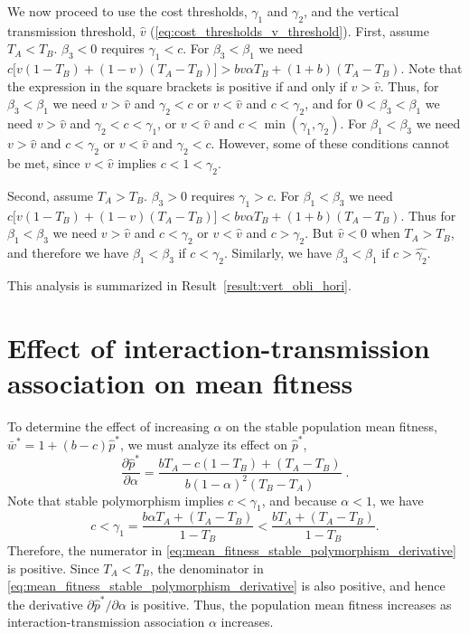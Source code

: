 \documentclass[12pt]{extarticle}
\begin{document}
\begin{appendices}
We now proceed to use the cost thresholds, $\gamma_1$ and $\gamma_2$, and the vertical transmission threshold, $\hat v$ (\autoref{eq:cost_thresholds_v_threshold}).
First, assume $T_A<T_B$.
$\beta_3<0$ requires $\gamma_1<c$.
For $\beta_3<\beta_1$ we need $c\big[v(1-T_B) + (1-v)(T_A-T_B)\big] > bv\alpha T_B + (1+b)(T_A-T_B)$.
Note that the expression in the square brackets is positive if and only if $v > \hat v$.
Thus, for $\beta_3<\beta_1$ we need $v > \hat v$ and $\gamma_2 < c$ or $v < \hat v$ and $c < \gamma_2$,
and for $0<\beta_3<\beta_1$ we need $v > \hat v$ and $\gamma_2 < c < \gamma_1$, or $v < \hat v$ and $c < \min(\gamma_1, \gamma_2)$. For $\beta_1<\beta_3$ we need $v > \hat v$ and $c<\gamma_2$ or $v < \hat v$ and $\gamma_2<c$.
However, some of these conditions cannot be met, since $v < \hat v$ implies $c<1<\gamma_2$.

Second, assume $T_A>T_B$.
$\beta_3>0$ requires $\gamma_1 > c$. 
For $\beta_1<\beta_3$ we need $c\big[v(1-T_B) + (1-v)(T_A-T_B)\big] < bv\alpha T_B + (1+b)(T_A-T_B)$.
Thus for $\beta_1<\beta_3$ we need $v > \hat v$ and $c < \gamma_2 $ or $v < \hat v$ and $c > \gamma_2$.
But $\hat{v}<0$ when $T_A > T_B$, and therefore we have $\beta_1<\beta_3$ if $c < \gamma_2$. Similarly, we have $\beta_3<\beta_1$ if $c > \hat{\gamma_2}$.

This analysis is summarized in Result~\ref{result:vert_obli_hori}.

\newpage
\section{Effect of interaction-transmission association on mean fitness} \label{sec:appendixC}

To determine the effect of increasing $\alpha$ on the stable population mean fitness, $\bar{w}^*=1+(b-c)\hat{p}^*$, we must analyze its effect on $\hat{p}^*$, 
\begin{equation} \label{eq:mean_fitness_stable_polymorphism_derivative}
  \frac{\partial \hat{p}^*}{\partial \alpha} 
  = \frac{b T_A - c(1-T_B) + (T_A-T_B)}{b (1-\alpha)^2 (T_B-T_A)} \;.
\end{equation} 
Note that stable polymorphism implies $c<\gamma_1$, and because $\alpha<1$, we have
\begin{equation}
c < \gamma_1 = \frac{b \alpha T_A + (T_A-T_B)}{1-T_B} < \frac{b T_A + (T_A-T_B)}{1-T_B}.
\end{equation} 
Therefore, the numerator in \autoref{eq:mean_fitness_stable_polymorphism_derivative} is positive.
Since $T_A<T_B$, the denominator in \autoref{eq:mean_fitness_stable_polymorphism_derivative} is also positive, and hence the derivative $\partial \hat{p}^* / \partial \alpha$ is positive.
Thus, the population mean fitness increases as interaction-transmission association $\alpha$ increases.




\end{appendices}
\end{document}
